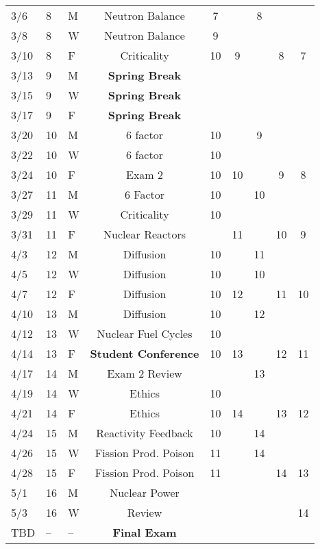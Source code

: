 \documentclass[11pt, a4paper]{article}
\begin{document}
\begin{table}[h]
\begin{center}
\begin{tabular}{lllcccccc}
3/6 & 8 & M & Neutron Balance     & 7 &  & 8 &  &  \\
3/8 & 8 & W & Neutron Balance         & 9 &   &  &  &  \\
3/10 & 8 & F & Criticality        & 10 & 9 &  & 8 & 7 \\
3/13 & 9 & M & \textbf{Spring Break}&  &  &  &  &  \\
3/15 & 9 & W & \textbf{Spring Break}&  &  &  &  &  \\
3/17 & 9 & F & \textbf{Spring Break}&  &  &  &  &  \\
3/20 & 10 & M & 6 factor          & 10 &  & 9 &  &  \\
3/22 & 10 & W & 6 factor          & 10 &  &  &  &  \\
3/24 & 10 & F & Exam 2          & 10 & 10 &  & 9 & 8 \\
3/27 & 11 & M & 6 Factor            & 10 &  & 10 &  &  \\
3/29 & 11 & W & Criticality            & 10 &  &  &  & \\
3/31 & 11 & F & Nuclear Reactors  &  &  11 &  & 10 & 9 \\
4/3 & 12 & M & Diffusion &  10  &   & 11 &  &  \\
4/5 & 12 & W & Diffusion & 10  &  & 10 &  &  \\
4/7 & 12 & F & Diffusion & 10 & 12 &  & 11 & 10 \\
4/10 & 13 & M & Diffusion & 10 &  & 12 & &  \\
4/12 & 13 & W & Nuclear Fuel Cycles & 10 &  &  &  &  \\
4/14 & 13 & F & \textbf{Student Conference}    & 10 & 13 &  & 12 & 11 \\
4/17 & 14 & M & Exam 2 Review    &  &  & 13  &  &  \\
4/19 & 14 & W & Ethics     & 10 & &  &  & \\
4/21 & 14 & F & Ethics    & 10 & 14 &  & 13 & 12 \\
4/24 & 15 & M & Reactivity Feedback    & 10  &  & 14 & &  \\
4/26 & 15 & W & Fission Prod. Poison        & 11 &  & 14 &  &  \\
4/28 & 15 & F & Fission Prod. Poison        & 11 &  &  & 14 & 13 \\
5/1 & 16 & M & Nuclear Power                &  &  & &  &      \\
5/3 & 16 & W &  Review               &  &  &  &  &  14 \\
TBD & -- & -- & \textbf{Final Exam}  &  &  &  &  &     \\
\end{tabular}
\end{center}
\end{table}
\FloatBarrier



\end{document}
